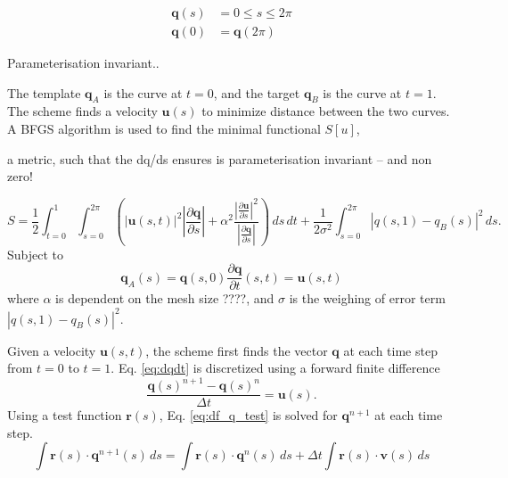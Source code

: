 \documentclass[a4paper, 10pt]{article}
\newcommand{\eq}[1]{Eq. \ref{eq:#1}}
\newcommand{\vect}[1]{\ensuremath{\mathbf{#1}}}
\begin{document}
\begin{align*}
  \vect q(s) &= 0 \leq s \leq 2\pi \\
  \vect q(0) &= \vect q(2\pi)
\end{align*}


Parameterisation invariant..


The template $\vect q_A$ is the curve at $t=0$, and the target $\vect q_B$
is the curve at $t=1$. The scheme finds a velocity $\vect u(s)$ to minimize
distance between the two curves. A BFGS algorithm is used to find the minimal
functional $S[u]$,

a metric, such that the dq/ds ensures is parameterisation invariant -- and non zero!

\begin{equation}
  \label{eq:S}
  S = \frac{1}{2} \int^{1}_{t=0} \int^{2\pi}_{s=0}\left( \left| \vect u(s,t) \right|^2 
  \left| \frac{\partial \vect q}{\partial s} \right|  + 
  \alpha^2 \frac{ 
    \left| \frac{\partial \vect u}{\partial s}\right|^2}{
    \left| \frac{\partial \vect q}{\partial s}\right|}\right)  \,ds\,dt
  + \frac{1}{2\sigma^2}\int^{2\pi}_{s=0}\left| q(s,1) - q_B(s)\right|^2\,ds.
\end{equation}
Subject to
\begin{subequations}
\begin{equation}
  \vect q_A(s) =\vect q(s,0)   \label{eq:template}
\end{equation}
\begin{equation}
  \frac{\partial \vect q}{\partial t}(s,t) = \vect u(s,t)  \label{eq:dqdt}
\end{equation}
\end{subequations}
where $\alpha$ is dependent on the mesh size ????, and $\sigma$ is the weighing
of error term $\left| q(s,1) - q_B(s)\right|^2$.



Given a velocity $\vect u(s,t)$, the scheme first finds the vector $\vect q$ at
each time step from $t=0$ to $t=1$. \eq{dqdt} is discretized using a forward finite difference
\begin{equation}
  \label{eq:fd_q}
  \frac{\vect q(s)^{n+1}- \vect q(s)^n}{\Delta t} = \vect u(s).
\end{equation}
Using a test function $\vect r(s)$, \eq{df_q_test} is solved for $\vect q^{n+1}$
at each time step.
  \begin{equation}
    \label{eq:df_q_test}
    \int \vect{r}(s) \cdot \vect{q}^{n+1}(s)\, ds = \int \vect{r}(s) \cdot
    \vect{q}^n (s)\,ds + \Delta t \int \vect{r}(s)\cdot \vect{v}(s)\, ds
  \end{equation}
\end{document}
